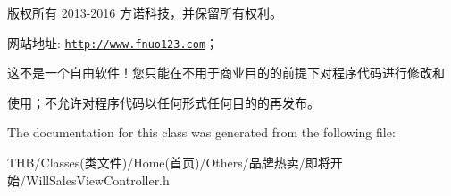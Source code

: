 版权所有 2013-\/2016 方诺科技，并保留所有权利。

网站地址\+: \href{http://www.fnuo123.com}{\tt http\+://www.\+fnuo123.\+com}； 



这不是一个自由软件！您只能在不用于商业目的的前提下对程序代码进行修改和

使用；不允许对程序代码以任何形式任何目的的再发布。 

 

The documentation for this class was generated from the following file\+:\begin{DoxyCompactItemize}
\item 
T\+H\+B/\+Classes(类文件)/\+Home(首页)/\+Others/品牌热卖/即将开始/Will\+Sales\+View\+Controller.\+h\end{DoxyCompactItemize}
